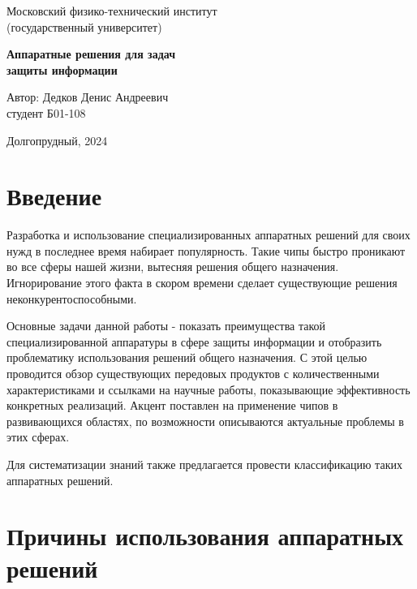 \documentclass[a4paper,12pt]{article}
\begin{document}
	
\begin{center}
	
        \normalsize Московский физико-технический институт \\
						(государственный университет)
	\vspace{46ex}
	

	\Large \textbf{Аппаратные решения для задач \\ защиты информации}

	\vspace{40ex}
\end{center}
\begin{flushright}
	\normalsize{Автор: Дедков Денис Андреевич \\ студент Б01-108 \\}
\end{flushright}

\vfill

\begin{center}
	Долгопрудный, 2024
\end{center}

\thispagestyle{empty} %

\newpage

\tableofcontents{}
\newpage

\section{Введение}

Разработка и использование специализированных аппаратных решений для своих нужд в последнее время набирает популярность. Такие чипы быстро проникают во все сферы нашей жизни, вытесняя решения общего назначения. Игнорирование этого факта в скором времени сделает существующие решения неконкурентоспособными.

Основные задачи данной работы - показать преимущества такой специализированной аппаратуры в сфере защиты информации и отобразить проблематику использования решений общего назначения. С этой целью проводится обзор существующих передовых продуктов с количественными характеристиками и ссылками на научные работы, показывающие эффективность конкретных реализаций. Акцент поставлен на применение чипов в развивающихся областях, по возможности описываются актуальные проблемы в этих сферах.

Для систематизации знаний также предлагается провести классификацию таких аппаратных решений.

\section{Причины использования аппаратных решений}
\end{document}
